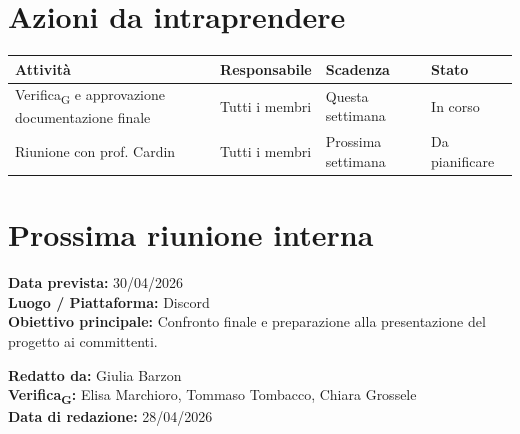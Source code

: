 \documentclass[a4paper,12pt]{article}
\newcommand{\gls}[1]{#1\textsubscript{G}}
\begin{document}
\section*{ Azioni da intraprendere}
\begin{longtable}{|p{}|p{}|p{}|p{}|}
\hline
\textbf{Attività} & \textbf{Responsabile} & \textbf{Scadenza} & \textbf{Stato} \\ \hline
    \gls{Verifica} e approvazione documentazione finale & Tutti i membri & Questa settimana & In corso \\ \hline
    Riunione con prof. Cardin & Tutti i membri & Prossima settimana & Da pianificare \\ \hline
\end{longtable}


\section*{Prossima riunione interna}
\textbf{Data prevista:} 30/04/2026 \\
\textbf{Luogo / Piattaforma:} Discord \\
\textbf{Obiettivo principale:} Confronto finale e preparazione alla presentazione del progetto ai committenti.


\textbf{Redatto da:} Giulia Barzon \\
\textbf{\gls{Verifica}:} Elisa Marchioro, Tommaso Tombacco, Chiara Grossele\\
\textbf{Data di redazione:} 28/04/2026
\end{document}
